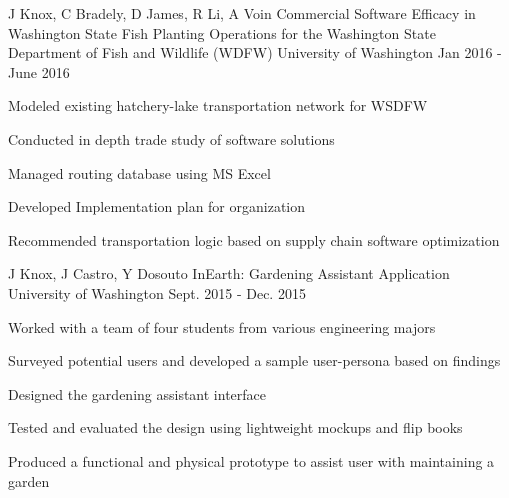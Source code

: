 

\begin{cventries}

  \cventry
    {J Knox, C Bradely, D James, R Li, A Voin} %
    {Commercial Software Efficacy in Washington State Fish Planting Operations for the Washington State Department of Fish and Wildlife (WDFW)} %
    {University of Washington} %
    {Jan 2016 - June 2016} %
    {
      \begin{cvitems} %
        \item {Modeled existing hatchery-lake transportation network for WSDFW}
        \item {Conducted in depth trade study of software solutions}
        \item {Managed routing database using MS Excel}
        \item {Developed Implementation plan for organization}
        \item {Recommended transportation logic based on supply chain software optimization}
      \end{cvitems}
    }

  \cventry
    {J Knox, J Castro, Y Dosouto} %
    {InEarth: Gardening Assistant Application} %
    {University of Washington} %
    {Sept. 2015 - Dec. 2015} %
    {
      \begin{cvitems} %
        \item {Worked with a team of four students from various engineering majors}
        \item {Surveyed potential users and developed a sample user-persona based on findings}
        \item {Designed the gardening assistant interface}
        \item {Tested and evaluated the design using lightweight mockups and flip books}
        \item {Produced a functional and physical prototype to assist user with maintaining a garden}
      \end{cvitems}
    }



\end{cventries}
